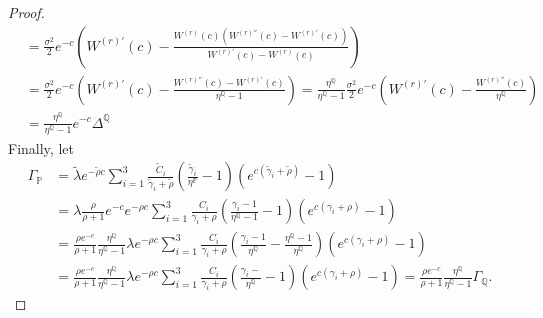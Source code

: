 \documentclass[10pt]{amsart}
\def\P{{\mathbb{P}}}
\def\Q{{\mathbb{Q}}}
\def\P{{\mathbb P}} \def\le{\left} \def\ri{\right} \def\i{\infty}
\begin{document}
\begin{proof}
\begin{align*}
				\nonumber &= \frac{\sigma^2}{2} e^{-c} \left( W^{(r)'}(c) -  \frac{W^{(r)}(c)\left( W^{(r)''}(c) -W^{(r)'}(c)  \right)}{W^{(r)'}(c) - W^{(r)}(c)} \right) \\
				\nonumber &= \frac{\sigma^2}{2} e^{-c} \left( W^{(r)'}(c) -  \frac{ W^{(r)''}(c) -W^{(r)'}(c)  }{\eta^\Q-1} \right) = \frac{\eta^\Q}{\eta^\Q-1} \frac{\sigma^2}{2} e^{-c} \left( W^{(r)'}(c) - \frac{W^{(r)''}(c)}{\eta^\Q} \right) \\
				\nonumber &=  \frac{\eta^\Q}{\eta^\Q-1} e^{-c} \Delta^\Q
			\end{align*}
			Finally, let
			\begin{align*}
				\Gamma_\P &= \tilde{\lambda} e^{-\tilde{\rho} c} \sum_{i=1}^3 \frac{\tilde{C}_i}{\tilde{\gamma}_i + \tilde{\rho}} \left( \frac{\tilde{\gamma}_i}{\eta^\P}-1\right)\left(e^{c(\tilde{\gamma}_i+\tilde{\rho})}-1\right) \\
				\nonumber &= \lambda \frac{\rho}{\rho+1} e^{-c} e^{-\rho c} \sum_{i=1}^3 \frac{C_i}{\gamma_i + \rho} \left( \frac{\gamma_i-1}{\eta^\Q-1}-1\right)\left(e^{c(\gamma_i+\rho)}-1\right) \\
				\nonumber &=  \frac{\rho e^{-c}}{\rho+1} \frac{\eta^\Q}{\eta^\Q-1}  \lambda e^{-\rho c} \sum_{i=1}^3 \frac{C_i}{\gamma_i + \rho} \left( \frac{\gamma_i-1}{\eta^\Q}-\frac{\eta^\Q-1}{\eta^\Q}\right)\left(e^{c(\gamma_i+\rho)}-1\right) \\
				\nonumber &=  \frac{\rho e^{-c}}{\rho+1} \frac{\eta^\Q}{\eta^\Q-1}  \lambda e^{-\rho c} \sum_{i=1}^3 \frac{C_i}{\gamma_i + \rho} \left( \frac{\gamma_i-}{\eta^\Q}-1\right)\left(e^{c(\gamma_i+\rho)}-1\right) = \frac{\rho e^{-c}}{\rho+1} \frac{\eta^\Q}{\eta^\Q-1} \Gamma_\Q.
			\end{align*}
			

\end{proof}
\end{document}
